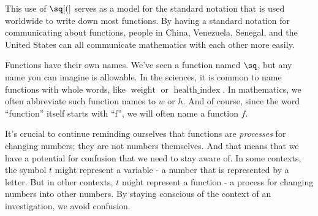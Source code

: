 	This use of $\sq[(]$ serves as a model for the standard notation that is used worldwide to 
	write down most functions. By having a standard notation for communicating about functions, 
	people in China, Venezuela, Senegal, and the United States can all communicate mathematics 
	with each other more easily. 
	
	Functions have their own names. We've seen a function named $\sq$, but any name you can 
	imagine is allowable. In the sciences, it is common to name functions with whole words, 
	like $\operatorname{weight}$ or $\operatorname{health\_index}$. In mathematics, we often
	abbreviate such function names to $w$ or $h$. And of course, since the word ``function''
	itself starts with ``f'', we will often name a function $f$. 
	
	It's crucial to continue reminding ourselves that functions are \emph{processes} for
	changing numbers; they are not numbers themselves. And that means that we have a potential
	for confusion that we need to stay aware of. In some contexts, the symbol $t$ might
	represent a variable - a number that is represented by a letter. But in other contexts, $t$
	might represent a function - a process for changing numbers into other numbers. By
	staying conscious of the context of an investigation, we avoid confusion.
	
